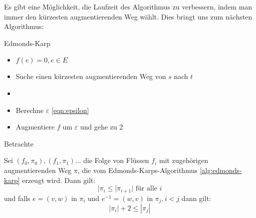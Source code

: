 Es gibt eine Möglichkeit, die Laufzeit des Algorithmus zu verbessern, indem man immer den kürzesten augmentierenden Weg wählt. Dies bringt uns zum nächsten Algorithmus: \\
\begin{algorithm}[H]
	\label{alg:edmonds-karp}
	\caption{Edmonds-Karp}
	\begin{itemize}
		\item $f(e)=0, e \in E$ 
		\item Suche einen kürzesten augmentierenden Weg von $s$ nach $t$
		\item {}
		\item Berechne $\varepsilon$ \eqref{eqn:epsilon}
		\item Augmentiere $f$ um $\varepsilon $ und gehe zu 2
	\end{itemize}
\end{algorithm}
\begin{example}
Betrachte
\end{example}
\begin{lemma}
	Sei $(f_0,\pi_0),(f_1,\pi_1)\ldots$ die Folge von Flüssen $f_i$ mit zugehörigen augmentierenden Weg $\pi $, die vom Edmonds-Karps-Algorithmus \ref{alg:edmonds-karp} erzeugt wird. Dann gilt:
	\[
	|\pi_i \le |\pi_{i+1}| \text{ für alle } i
	\]
und falls $e=(v,w)$ in $\pi_i $ und $e^{-1}=(w,v)$ in $\pi_j,  i<j$ dann gilt:
\[
|\pi_i| +2 \le |\pi_j|
\]
\end{lemma}
